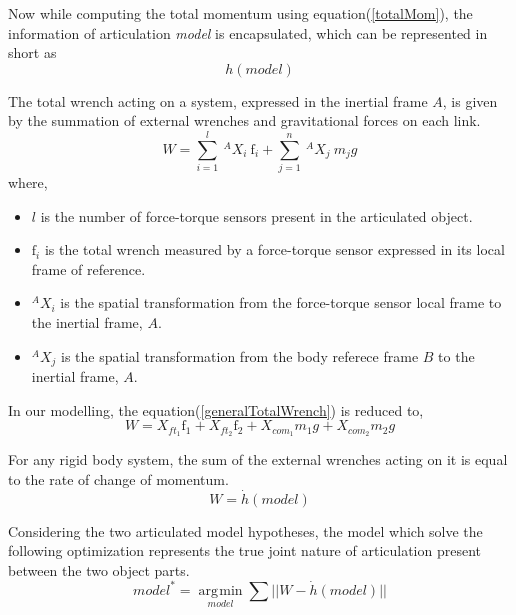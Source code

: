\documentclass[12pt,a4paper]{report}
\DeclareMathOperator*{\argmin}{\arg\!\min}
\begin{document}
  Now while computing the total momentum using equation(\ref{totalMom}), the information of articulation \textit{model} is encapsulated, which can be represented in short as
  \begin{equation}
    h(model)
  \end{equation}
  
  The total wrench acting on a system, expressed in the inertial frame $A$, is given by the summation of external wrenches and gravitational forces on each link.  
\begin{equation}
  W=\sum\limits_{i=1}^l \ ^AX_i \ \text{f}_i + \sum\limits_{j=1}^n \ ^AX_j \ m_jg
\label{generalTotalWrench}
\end{equation}
where,
\begin{itemize}
  \item $l$ is the number of force-torque sensors present in the articulated object.
  \item $\mathrm{f}_i$ is the total wrench measured by a force-torque sensor expressed in its local frame of reference.
  \item $^AX_i$ is the spatial transformation from the force-torque sensor local frame to the inertial frame, $A$.
  \item $^AX_j$ is the spatial transformation from the body referece frame $B$ to the inertial frame, $A$.
\end{itemize}

In our modelling, the equation(\ref{generalTotalWrench}) is reduced to,
\begin{equation}
  W= X_{ft_1}\text{f}_1 + X_{ft_2}\text{f}_2 +  X_{com_1}m_1g + X_{com_2}m_2g
\label{TotalWrench}
\end{equation}

 For any rigid body system, the sum of the external wrenches acting on it is equal to the rate of change of momentum. 
\begin{equation}
  W=\dot{h}(model)
  \label{relation}
\end{equation}

  Considering the two articulated model hypotheses, the model which solve the following optimization represents the true joint nature of articulation present between the two object parts.
  \begin{equation}
    model^*= \argmin\limits_{model}\sum||W-\dot{h}(model)||
  \end{equation}
  
\end{document}
